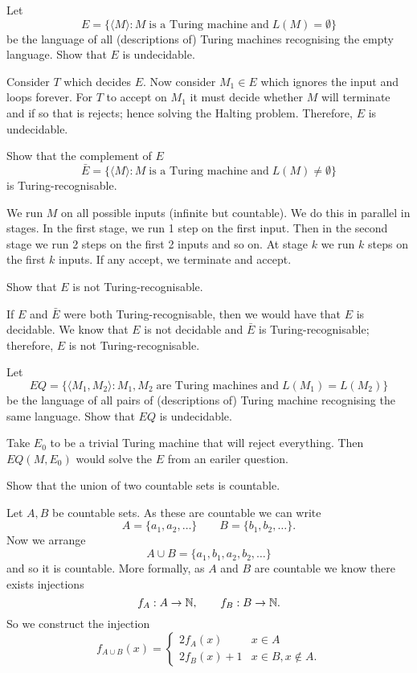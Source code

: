\question Let
\[ E = \{\langle M \rangle : M \;\text{is a Turing machine}\;\text{and}\; L(M) = \emptyset\} \]
be the language of all (descriptions of) Turing machines recognising the empty language. Show that $E$ is undecidable.
\begin{solution}
    Consider $T$ which decides $E$. Now consider $M_1 \in E$ which ignores the input and loops forever. For $T$ to accept on $M_1$ it must decide whether $M$ will terminate and if so that is rejects; hence solving the Halting problem. Therefore, $E$ is undecidable.
\end{solution}

\question Show that the complement of $E$
\[ \bar E = \{\langle M \rangle : M \;\text{is a Turing machine}\;\text{and}\; L(M) \neq \emptyset\} \]
is Turing-recognisable.
\begin{solution}
    We run $M$ on all possible inputs (infinite but countable). We do this in parallel in stages. In the first stage, we run 1 step on the first input. Then in the second stage we run 2 steps on the first 2 inputs and so on. At stage $k$ we run $k$ steps on the first $k$ inputs. If any accept, we terminate and accept.
\end{solution}

\question Show that $E$ is not Turing-recognisable.
\begin{solution}
    If $E$ and $\bar E$ were both Turing-recognisable, then we would have that $E$ is decidable. We know that $E$ is not decidable and $\bar E$ is Turing-recognisable; therefore, $E$ is not Turing-recognisable.
\end{solution}

\question Let
\[ EQ = \{\langle M_1, M_2 \rangle : M_1, M_2 \;\text{are Turing machines} \;\text{and}\; L(M_1) = L(M_2)\} \]
be the language of all pairs of (descriptions of) Turing machine recognising the same language. Show that $EQ$ is undecidable.
\begin{solution}
    Take $E_0$ to be a trivial Turing machine that will reject everything. Then $EQ(M, E_0)$ would solve the $E$ from an eariler question.
\end{solution}

\question Show that the union of two countable sets is countable.
\begin{solution}
    Let $A, B$ be countable sets. As these are countable we can write
    \[ A = \{ a_1, a_2, \ldots \} \qquad B = \{ b_1, b_2, \ldots \}. \]
    Now we arrange
    \[ A \cup B = \{ a_1, b_1, a_2, b_2, \ldots \} \]
    and so it is countable. More formally, as $A$ and $B$ are countable we know there exists injections
    \[ f_A: A \to \mathbb{N}, \qquad f_B: B \to \mathbb{N}. \]
    So we construct the injection
    \[ 
        f_{A \cup B}(x) = 
        \begin{cases}
            2f_A(x)     & x \in A \\
            2f_B(x) + 1 & x \in B, x \not \in A.
        \end{cases}
    \]
\end{solution}

